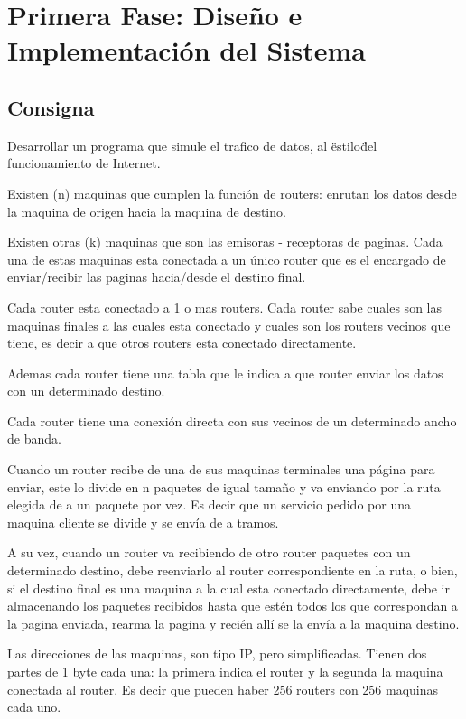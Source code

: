 \documentclass[12pt]{article} %
\begin{document}
\section{Primera Fase: Diseño e Implementación del Sistema} %

\subsection{Consigna}

Desarrollar un programa que simule el trafico de datos, al \"estilo\" del funcionamiento de Internet.

Existen (n) maquinas que cumplen la función de routers: enrutan los datos desde la maquina de origen hacia la maquina de destino.

Existen otras (k) maquinas que son las emisoras - receptoras de paginas. Cada una de estas maquinas esta conectada a un único router que es el encargado de enviar/recibir las paginas hacia/desde el destino final.

Cada router esta conectado a 1 o mas routers. Cada router sabe cuales son las maquinas finales a las cuales esta conectado y cuales son los routers vecinos que tiene, es decir a que otros routers esta conectado directamente.

Ademas cada router tiene una tabla que le indica a que router enviar los datos con un determinado destino.

Cada router tiene una conexión directa con sus vecinos de un determinado ancho de banda.

Cuando un router recibe de una de sus maquinas terminales una página para enviar, este lo divide en n paquetes de igual tamaño y va enviando por la ruta elegida de a un paquete por vez. Es decir que un servicio pedido por una maquina cliente se divide y se envía de a tramos.

A su vez, cuando un router va recibiendo de otro router paquetes con un determinado destino, debe reenviarlo al router correspondiente en la ruta, o bien, si el destino final es una maquina a la cual esta conectado directamente, debe ir almacenando los paquetes recibidos hasta que estén todos los que correspondan a la pagina enviada, rearma la pagina y recién allí se la envía a la maquina destino.

Las direcciones de las maquinas, son tipo IP, pero simplificadas. Tienen dos partes de 1 byte cada una: la primera indica el router y la segunda la maquina conectada al router. Es decir que pueden haber 256 routers con 256 maquinas cada uno.
\end{document}
